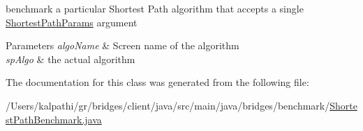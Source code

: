benchmark a particular Shortest Path algorithm that accepts a single \mbox{\hyperlink{classbridges_1_1benchmark_1_1_shortest_path_params}{Shortest\+Path\+Params}} argument 


\begin{DoxyParams}{Parameters}
{\em algo\+Name} & Screen name of the algorithm \\
\hline
{\em sp\+Algo} & the actual algorithm \\
\hline
\end{DoxyParams}


The documentation for this class was generated from the following file\+:\begin{DoxyCompactItemize}
\item 
/\+Users/kalpathi/gr/bridges/client/java/src/main/java/bridges/benchmark/\mbox{\hyperlink{_shortest_path_benchmark_8java}{Shortest\+Path\+Benchmark.\+java}}\end{DoxyCompactItemize}
